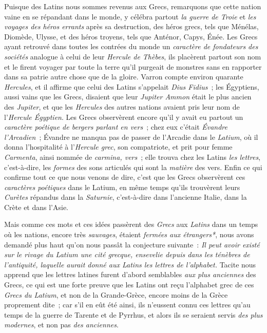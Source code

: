 \documentclass[french,twoside]{book} %
\begin{document}
{Puisque des Latins nous sommes revenus aux Grecs, remarquons que cette nation vaine en se répandant dans le monde, y célébra partout {\itshape la guerre de Troie} et {\itshape les voyages des héros errants} après sa destruction, des héros grecs, tels que Ménélas, Diomède, Ulysse, et des héros troyens, tels que Anténor, Capys, Énée. Les Grecs ayant retrouvé dans toutes les contrées du monde un {\itshape caractère de fondateurs des sociétés} analogue à celui de leur {\itshape Hercule de Thèbes}, ils placèrent partout son nom et le firent voyager par toute la terre qu’il purgeait de monstres sans en rapporter dans sa patrie autre chose que de la gloire. Varron compte environ quarante {\itshape Hercules}, et il affirme que celui des Latins s’appelait {\itshape Dius Fidius} ; les Égyptiens, aussi vains que les Grecs, disaient que leur {\itshape Jupiter Ammon} était le plus ancien des {\itshape Jupiter}, et que les {\itshape Hercules} des autres nations avaient pris leur nom de l’{\itshape Hercule Égyptien}. Les Grecs observèrent encore qu’il y avait eu partout un {\itshape caractère poétique de bergers parlant en vers} ; chez eux c’était {\itshape Évandre l’Arcadien} ; Évandre ne manqua pas de passer de l’Arcadie dans le {\itshape Latium}, où il donna l’hospitalité à l’{\itshape Hercule grec}, son compatriote, et prit pour femme {\itshape Carmenta}, ainsi nommée de {\itshape carmina, vers} ; elle trouva chez les Latins {\itshape les lettres}, c’est-à-dire, les {\itshape formes} des sons articulés qui sont la {\itshape matière} des vers. Enfin ce qui confirme tout ce que nous venons de dire, c’est que les Grecs observèrent ces {\itshape caractères poétiques} dans le Latium, en même temps qu’ils trouvèrent leurs {\itshape Curètes} répandus dans la {\itshape Saturnie}, c’est-à-dire dans l’ancienne Italie, dans la Crète et dans l’Asie.\par
Mais comme ces mots et ces idées passèrent des {\itshape Grecs} aux {\itshape Latins} dans un temps où les nations, encore très {\itshape sauvages}, étaient {\itshape fermées aux étrangers*}, nous avons demandé plus haut qu’on nous passât la conjecture suivante : {\itshape Il peut avoir existé sur le rivage du Latium une cité grecque, ensevelie depuis dans les ténèbres de l’antiquité, laquelle aurait donné aux Latins les lettres de l’alphabet.} Tacite nous apprend que les lettres latines furent d’abord semblables \emph{{\itshape aux plus anciennes}} des Grecs, ce qui est une forte preuve que les Latins ont reçu l’alphabet grec de ces {\itshape Grecs du Latium}, et non de la Grande-Grèce, encore moins de la Grèce proprement dite ; car s’il en eût été ainsi, ils n’eussent connu ces lettres qu’au temps de la guerre de Tarente et de Pyrrhus, et alors ils se seraient servis {\itshape des plus modernes}, et non pas {\itshape des anciennes}.\par
}
\end{document}
